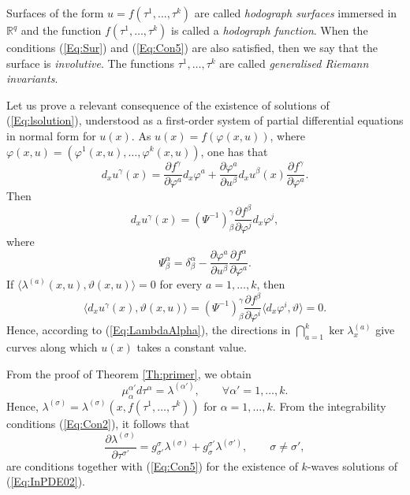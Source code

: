 \documentclass{birkjour}
\theoremstyle{definition}
\theoremstyle{remark}
\numberwithin{equation}{section}
\numberwithin{equation}{section}
\numberwithin{thm}{section}
\numberwithin{equation}{section}
\numberwithin{thm}{section}
\begin{document}
Surfaces of the form $u=f(\tau^1,\ldots,\tau^k)$ are called {\it hodograph surfaces} immersed in $\mathbb{R}^q$ and the function $f(\tau^1,\ldots,\tau^k)$ is called a {\it hodograph function}. When the conditions (\ref{Eq:Sur}) and (\ref{Eq:Con5}) are also satisfied, then we say that the surface is {\it involutive}. The functions $\tau^1,\ldots,\tau^k$ are called {\it generalised Riemann invariants}.

Let us prove a relevant consequence of the existence of solutions of (\ref{Eq:lsolution}), understood as a first-order system of partial differential equations in normal form for $u(x)$. As $u(x)=f(\varphi(x,u))$, where $\varphi(x,u)=(\varphi^1(x,u),\ldots,\varphi^k(x,u))$, one has that
$$
d_xu^\gamma(x)=\frac{\partial f^\gamma}{\partial \varphi^a}d_x\varphi^a+\frac{\partial \varphi^a}{\partial u^\beta}d_xu^\beta(x)\frac{\partial f^\gamma}{\partial \varphi^a}.
$$
Then
$$
d_xu^\gamma(x)=(\Psi^{-1})^\gamma_\beta\frac{\partial f^\beta}{\partial \varphi^j}d_x\varphi^j,
$$
where 
$$
\Psi^\alpha_\beta=\delta^\alpha_\beta-\frac{\partial \varphi^a}{\partial u^\beta}\frac{\partial f^\alpha}{\partial \varphi^a}.
$$
If $\langle\lambda^{(a)}(x,u),\vartheta(x,u)\rangle=0$ for every $a=1,\ldots,k$, then
$$
\langle d_xu^\gamma(x),\vartheta(x,u)\rangle=(\Psi^{-1})^\gamma_\beta\frac{\partial f^\beta}{\partial \varphi^i}\langle d_x\varphi^i,\vartheta\rangle=0. 
$$
Hence, according to (\ref{Eq:LambdaAlpha}), the directions in $\bigcap_{a=1}^k \ker \lambda^{(a)}_x$ give curves along which $u(x)$ takes a constant value. 

From the proof of Theorem \ref{Th:primer}, we obtain
$$
\mu^{\alpha'}_{\alpha}d\tau^\alpha=\lambda^{(\alpha')},\qquad \forall \alpha'=1,\ldots,k.
$$
Hence, $\lambda^{(\sigma)}=\lambda^{(\sigma)}(x,f(\tau^1,\ldots,\tau^k))$ for $\alpha=1,\ldots,k$. From the integrability conditions (\ref{Eq:Con2}), it follows that
$$
\frac{\partial \lambda^{(\sigma)}}{\partial \tau^{\sigma'}}=g^{\sigma}_{\sigma'}\lambda^{(\sigma)}+g^{\sigma'}_{\sigma}\lambda^{(\sigma')},\qquad \sigma\neq \sigma',
$$
are conditions together with (\ref{Eq:Con5}) for the existence of %
$k$-waves solutions of (\ref{Eq:InPDE02}). %

\end{document}
